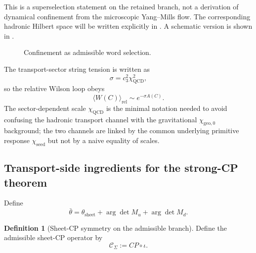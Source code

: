 \documentclass[11pt,a4paper]{article}
\theoremstyle{definition}
\newtheorem{definition}[theorem]{Definition}
\theoremstyle{remark}
\newcommand{\inv}{\iota}
\newcommand{\cthree}{c_3}
\newcommand{\QCD}{\mathrm{QCD}}
\newcommand{\chiseed}{\chi_{\mathrm{seed}}}
\newcommand{\chigeozero}{\chi_{\mathrm{geo},0}}
\begin{document}
This is a superselection statement on the retained branch, not a derivation of dynamical confinement from the microscopic Yang--Mills flow. The corresponding hadronic Hilbert space will be written explicitly in . A schematic version is shown in .

\begin{figure}[t]
\centering
{}
\caption{Confinement as admissible word selection.}
\label{fig:admissible-words}
\end{figure}

The transport-sector string tension is written as
\[
\sigma=\cthree^2\chi_{\QCD}^2,
\]
so the relative Wilson loop obeys
\[
\langle W(C)\rangle_{\mathrm{rel}}\sim e^{-\sigma A(C)}.
\]
The sector-dependent scale $\chi_{\QCD}$ is the minimal notation needed to avoid confusing the hadronic transport channel with the gravitational $\chigeozero$ background; the two channels are linked by the common underlying primitive response $\chiseed$ but not by a naive equality of scales.

\subsection{Transport-side ingredients for the strong-CP theorem}

Define
\begin{equation}
\label{eq:strong-cp}
\bar\theta=\theta_{\mathrm{sheet}}+\arg\det M_u+\arg\det M_d.
\end{equation}
\begin{definition}[Sheet-CP symmetry on the admissible branch]
\label{def:sheet-cp-symmetry}
Define the admissible sheet-CP operator by
\[
\mathcal C_\Sigma:=CP\circ\inv.
\]
\end{definition}
\end{document}
